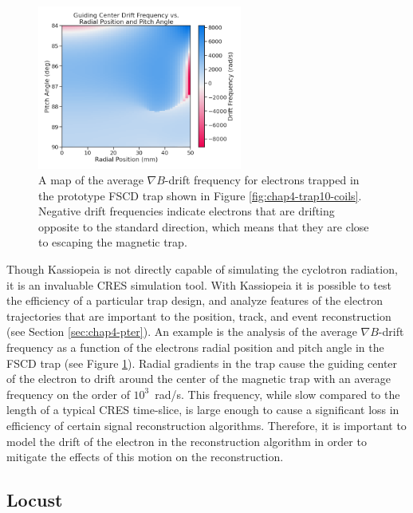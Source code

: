 \begin{figure}[htbp]
    \centering
    \includegraphics[width=0.6\textwidth]{figs/Chapter-4/230220_gradb_drift_frequencies.png}
    \caption{A map of the average $\nabla B$-drift frequency for electrons trapped in the prototype FSCD trap shown in Figure \ref{fig:chap4-trap10-coils}. Negative drift frequencies indicate electrons that are drifting opposite to the standard direction, which means that they are close to escaping the magnetic trap.}
    \label{fig:chap4-gradb-drift-frequency-map}
\end{figure}

Though Kassiopeia is not directly capable of simulating the cyclotron radiation, it is an invaluable CRES simulation tool. With Kassiopeia it is possible to test the efficiency of a particular trap design, and analyze features of the electron trajectories that are important to the position, track, and event reconstruction (see Section \ref{sec:chap4-pter}). An example is the analysis of the average $\nabla B$-drift frequency as a function of the electrons radial position and pitch angle in the FSCD trap (see Figure \ref{fig:chap4-gradb-drift-frequency-map}). Radial gradients in the trap cause the guiding center of the electron to drift around the center of the magnetic trap with an average frequency on the order of $10^3$~rad/s. This frequency, while slow compared to the length of a typical CRES time-slice, is large enough to cause a significant loss in efficiency of certain signal reconstruction algorithms. Therefore, it is important to model the drift of the electron in the reconstruction algorithm in order to mitigate the effects of this motion on the reconstruction.

\subsection{Locust}

